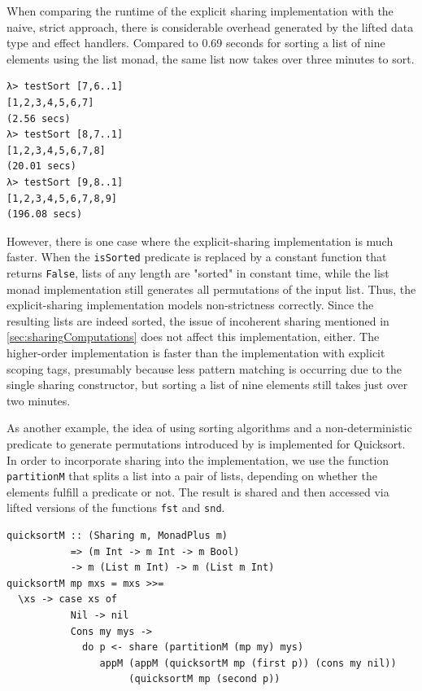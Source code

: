 \documentclass[a4paper, 11pt, fleqn, twoside]{scrreprt}
\newcommand{\hinl}[1]{\texttt{#1}}
\begin{document}
When comparing the runtime of the explicit sharing implementation with the naive, strict approach, there is considerable overhead generated by the lifted data type and effect handlers.
Compared to 0.69 seconds for sorting a list of nine elements using the list monad, the same list now takes over three minutes to sort.

\begin{verbatim}
λ> testSort [7,6..1]
[1,2,3,4,5,6,7]
(2.56 secs)
λ> testSort [8,7..1]
[1,2,3,4,5,6,7,8]
(20.01 secs)
λ> testSort [9,8..1]
[1,2,3,4,5,6,7,8,9]
(196.08 secs)
\end{verbatim}

However, there is one case where the explicit-sharing implementation is much faster.
When the \hinl{isSorted} predicate is replaced by a constant function that returns \hinl{False}, lists of any length are "sorted" in constant time, while the list monad implementation still generates all permutations of the input list.
Thus, the explicit-sharing implementation models non-strictness correctly.
Since the resulting lists are indeed sorted, the issue of incoherent sharing mentioned in \autoref{sec:sharingComputations} does not affect this implementation, either.
The higher-order implementation is faster than the implementation with explicit scoping tags, presumably because less pattern matching is occurring due to the single sharing constructor, but sorting a list of nine elements still takes just over two minutes.

As another example, the idea of using sorting algorithms and a non-deterministic predicate to generate permutations introduced by \citet{Christiansen2016allsorts} is implemented for Quicksort.
In order to incorporate sharing into the implementation, we use the function \hinl{partitionM} that splits a list into a pair of lists, depending on whether the elements fulfill a predicate or not.
The result is shared and then accessed via lifted versions of the functions \hinl{fst} and \hinl{snd}.

\begin{verbatim}
quicksortM :: (Sharing m, MonadPlus m) 
           => (m Int -> m Int -> m Bool) 
           -> m (List m Int) -> m (List m Int)
quicksortM mp mxs = mxs >>=
  \xs -> case xs of
           Nil -> nil
           Cons my mys ->
             do p <- share (partitionM (mp my) mys)
                appM (appM (quicksortM mp (first p)) (cons my nil)) 
                     (quicksortM mp (second p))
\end{verbatim}
\end{document}

